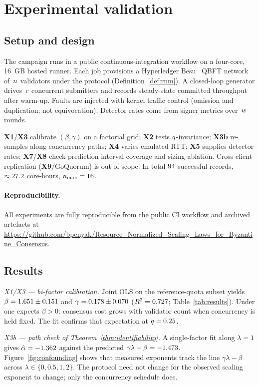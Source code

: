 \section{Experimental validation}
\label{sec:exp}

\subsection{Setup and design}

The campaign runs in a public continuous-integration workflow on a four-core,
16~GB hosted runner. Each job provisions a Hyperledger Besu~\cite{besu} QBFT
network of~$n$ validators under the \RNM{} protocol
(Definition~\ref{def:rnm}). A closed-loop generator drives~$c$ concurrent
submitters and records steady-state committed throughput after warm-up. Faults
are injected with kernel traffic control (omission and duplication; not
equivocation). Detector rates come from signer metrics over~$w$ rounds.

\textbf{X1}/\textbf{X3} calibrate $(\beta,\gamma)$ on a factorial grid;
\textbf{X2} tests $q$-invariance; \textbf{X3b} re-samples along concurrency
paths; \textbf{X4} varies emulated RTT; \textbf{X5} supplies detector rates;
\textbf{X7}/\textbf{X8} check prediction-interval coverage and sizing ablation.
Cross-client replication (\textbf{X9}/GoQuorum) is out of scope. In total
$94$ successful records, $\approx27.2$ core-hours,
$\n_{\max}=\resNmaxMeasured$.

\paragraph{Reproducibility.}
All experiments are fully reproducible from the public CI workflow and archived
artefacts at \url{https://github.com/bpenyak/Resource_Normalized_Scaling_Laws_for_Byzantine_Consensus}.

\subsection{Results}

\emph{X1/X3 --- bi-factor calibration.}
Joint OLS on the reference-quota subset yields
$\beta=1.651\pm0.151$ and $\gamma=0.178\pm0.070$
($R^{2}=0.727$; Table~\ref{tab:results}). Under \RNM{} one expects $\beta>0$:
consensus cost grows with validator count when concurrency is held fixed. The
fit confirms that expectation at $q=0.25$.

\emph{X3b --- path check of Theorem~\ref{thm:identifiability}.}
A single-factor fit along $\lambda=1$ gives $\hat{\alpha}=-1.362$ against the
predicted $\gamma\lambda-\beta=-1.473$.
Figure~\ref{fig:confounding} shows that measured exponents track the line
$\gamma\lambda-\beta$ across $\lambda\in\{0,0.5,1,2\}$. The protocol need not
change for the observed scaling exponent to change; only the concurrency
schedule does.

